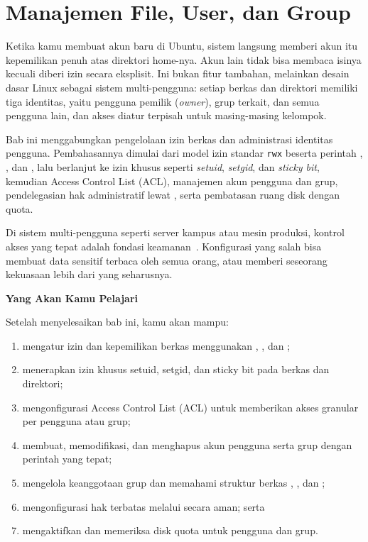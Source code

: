 
\chapter{Manajemen File, User, dan Group}
\label{ch:file-and-user-management}


Ketika kamu membuat akun baru di Ubuntu, sistem langsung memberi akun itu kepemilikan
penuh atas direktori home-nya. Akun lain tidak bisa membaca isinya kecuali diberi izin
secara eksplisit. Ini bukan fitur tambahan, melainkan desain dasar Linux sebagai sistem
multi-pengguna: setiap berkas dan direktori memiliki tiga identitas, yaitu pengguna
pemilik (\textit{owner}), grup terkait, dan semua pengguna lain, dan akses diatur
terpisah untuk masing-masing kelompok.

Bab ini menggabungkan pengelolaan izin berkas dan administrasi identitas pengguna. Pembahasannya dimulai dari model izin standar \texttt{rwx} beserta perintah , , dan , lalu berlanjut ke izin khusus seperti \textit{setuid}, \textit{setgid}, dan \textit{sticky bit}, kemudian Access Control List (ACL), manajemen akun pengguna dan grup, pendelegasian hak administratif lewat , serta pembatasan ruang disk dengan quota.

Di sistem multi-pengguna seperti server kampus atau mesin produksi, kontrol akses yang tepat adalah fondasi keamanan~\cite{nemeth2017unix}. Konfigurasi yang salah bisa membuat data sensitif terbaca oleh semua orang, atau memberi seseorang kekuasaan lebih dari yang seharusnya.

\textbf{Yang Akan Kamu Pelajari}

Setelah menyelesaikan bab ini, kamu akan mampu:

\begin{enumerate}
    \item mengatur izin dan kepemilikan berkas menggunakan , , dan ;
    \item menerapkan izin khusus setuid, setgid, dan sticky bit pada berkas dan direktori;
    \item mengonfigurasi Access Control List (ACL) untuk memberikan akses granular per pengguna atau grup;
    \item membuat, memodifikasi, dan menghapus akun pengguna serta grup dengan perintah yang tepat;
    \item mengelola keanggotaan grup dan memahami struktur berkas , , dan ;
    \item mengonfigurasi hak  terbatas melalui  secara aman; serta
    \item mengaktifkan dan memeriksa disk quota untuk pengguna dan grup.
\end{enumerate}

